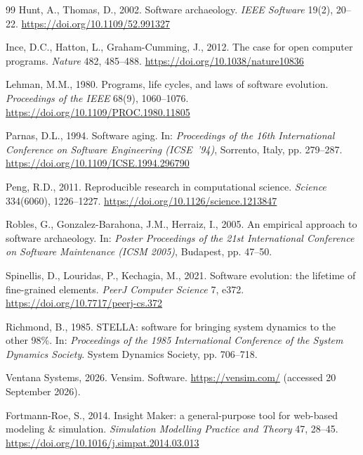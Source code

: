 \begin{thebibliography}{99}
Hunt, A., Thomas, D., 2002. Software archaeology. \emph{IEEE Software} 19(2), 20--22. \url{https://doi.org/10.1109/52.991327}

Ince, D.C., Hatton, L., Graham-Cumming, J., 2012. The case for open computer programs. \emph{Nature} 482, 485--488. \url{https://doi.org/10.1038/nature10836}

Lehman, M.M., 1980. Programs, life cycles, and laws of software evolution. \emph{Proceedings of the IEEE} 68(9), 1060--1076. \url{https://doi.org/10.1109/PROC.1980.11805}

Parnas, D.L., 1994. Software aging. In: \emph{Proceedings of the 16th International Conference on Software Engineering (ICSE~'94)}, Sorrento, Italy, pp. 279--287. \url{https://doi.org/10.1109/ICSE.1994.296790}

Peng, R.D., 2011. Reproducible research in computational science. \emph{Science} 334(6060), 1226--1227. \url{https://doi.org/10.1126/science.1213847}

Robles, G., Gonzalez-Barahona, J.M., Herraiz, I., 2005. An empirical approach to software archaeology. In: \emph{Poster Proceedings of the 21st International Conference on Software Maintenance (ICSM 2005)}, Budapest, pp. 47--50.

Spinellis, D., Louridas, P., Kechagia, M., 2021. Software evolution: the lifetime of fine-grained elements. \emph{PeerJ Computer Science} 7, e372. \url{https://doi.org/10.7717/peerj-cs.372}

Richmond, B., 1985. STELLA: software for bringing system dynamics to the other 98\%. In: \emph{Proceedings of the 1985 International Conference of the System Dynamics Society}. System Dynamics Society, pp. 706--718.

Ventana Systems, 2026. Vensim. Software. \url{https://vensim.com/} (accessed 20 September 2026).

Fortmann-Roe, S., 2014. Insight Maker: a general-purpose tool for web-based modeling \& simulation. \emph{Simulation Modelling Practice and Theory} 47, 28--45. \url{https://doi.org/10.1016/j.simpat.2014.03.013}


\end{thebibliography}
